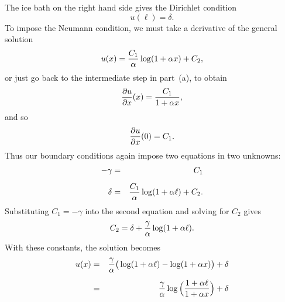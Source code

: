 {\begin{solution}
\begin{enumerate}
        The ice bath on the right hand side gives the Dirichlet condition
           \[ u(\ell) = \delta.\]
        To impose the Neumann condition, we must take a derivative of the general solution
          \[ u(x) = {C_1 \over \alpha} \log(1+\alpha x) + C_2,\]
        or just go back to the intermediate step in part~(a), to obtain
          \[ {{\partial} u \over {\partial} x}(x) = {C_1 \over 1+\alpha x},\]
        and so
          \[ {{\partial} u \over {\partial} x}(0) = {C_1}.\]
        Thus our boundary conditions again impose two equations in two unknowns:
        \begin{eqnarray*}
            -\gamma &=& C_1 \\[0.5em]
             \delta &=& {C_1\over \alpha} \log(1+\alpha \ell) + C_2.
         \end{eqnarray*}
         Substituting $C_1 = -\gamma$ into the second equation and solving for $C_2$ gives
           \[ C_2 = \delta + {\gamma \over \alpha} \log(1+\alpha \ell).\]
         With these constants, the solution becomes
           \begin{eqnarray*}
               u(x) &=& {\gamma \over \alpha} \big(\log(1+\alpha \ell) - \log (1+\alpha x)\big) + \delta \\[0.5em]
                    &=& {\gamma \over \alpha} \log\Big({1+\alpha \ell \over 1+\alpha x}\Big) + \delta  
           \end{eqnarray*} 
\end{enumerate}
\end{solution}}{}

